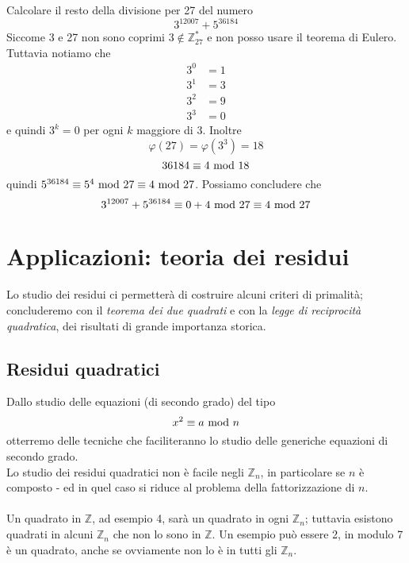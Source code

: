 \begin{esercizio}
	Calcolare il resto della divisione per 27 del numero 
	\begin{equation*}
		3^{12007}+5^{36184}
	\end{equation*}
	Siccome 3 e 27 non sono coprimi $3\notin\mathbb{Z}_{27}^*$ e non posso usare il teorema di Eulero. Tuttavia notiamo che
	\begin{align*}
	3^0&=1\\
	3^1&=3\\
	3^2&=9\\
	3^3&=0
	\end{align*}
	e quindi $3^k=0$ per ogni $k$ maggiore di 3. Inoltre
	\begin{equation*}
	\varphi(27)=\varphi(3^3)=18
	\end{equation*}
	\begin{equation*}
	36184\equiv4\ \mathrm{mod}\ 18
	\end{equation*}
	quindi $5^{36184}\equiv5^4\ \mathrm{mod}\ 27\equiv4\ \mathrm{mod}\ 27$. Possiamo concludere che 
	\begin{equation*}
	3^{12007}+5^{36184}\equiv0+4\ \mathrm{mod}\ 27\equiv4\ \mathrm{mod}\ 27
	\end{equation*}
\end{esercizio}




\chapter{Applicazioni: teoria dei residui}
Lo studio dei residui ci permetterà di costruire alcuni criteri di primalità; concluderemo con il \textit{teorema dei due quadrati} e con la \textit{legge di reciprocità quadratica}, dei risultati di grande importanza storica.
\section{Residui quadratici}
\label{lezione9}
Dallo studio delle equazioni (di secondo grado) del tipo
\begin{equation*}
x^2\equiv a\ \mathrm{mod}\ n
\end{equation*}
otterremo delle tecniche che faciliteranno lo studio delle generiche equazioni di secondo grado. \\ Lo studio dei residui quadratici non è facile negli $\mathbb{Z}_n$, in particolare se $n$ è composto - ed in quel caso si riduce al problema della fattorizzazione di $n$. \\ \\ Un quadrato in $\mathbb{Z}$, ad esempio 4, sarà un quadrato in ogni $\mathbb{Z}_n$; tuttavia esistono quadrati in alcuni $\mathbb{Z}_n$ che non lo sono in $\mathbb{Z}$. Un esempio può essere 2, in modulo 7 è un quadrato, anche se ovviamente non lo è in tutti gli $\mathbb{Z}_n$.




